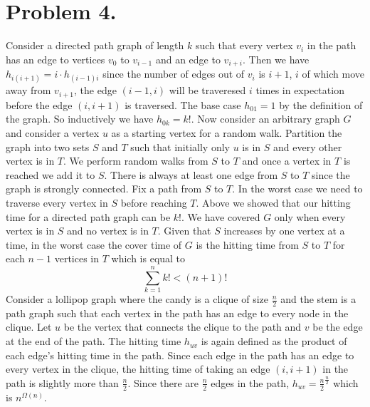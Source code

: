 \documentclass[12pt]{article}
\begin{document}
\pagestyle{plain}
\titleformat{\subsection}[runin]
  {\normalfont\large\bfseries}{\thesubsection}{1em}{}
\titleformat{\subsubsection}[runin]
  {\normalfont\large\bfseries}{\thesubsubsection}{1em}{}

\section*{Problem 4.}
Consider a directed path graph of length $k$ such that every vertex $v_i$ in the
path has an edge to vertices $v_0$ to $v_{i-1}$ and an edge to $v_{i+i}$. Then
we have $h_{i(i+1)} = i \cdot h_{(i-1)i}$ since the number of edges out of $v_i$
is $i+1$, $i$ of which move away from $v_{i+1}$, the edge $(i-1, i)$ will be
traveresed $i$ times in expectation before the edge $(i,i+1)$ is traversed. The
base case $h_{01} = 1$ by the definition of the graph. So inductively we have
$h_{0k} = k!$. Now consider an arbitrary graph $G$ and consider a vertex
$u$ as a starting vertex for a random walk. Partition the graph into two
sets $S$ and $T$ such that initially only $u$ is in $S$ and every other vertex
is in $T$. We perform random walks from $S$ to $T$ and once a vertex in $T$ is
reached we add it to $S$. There is always at least one edge from $S$ to $T$ since
the graph is strongly connected. Fix a path from $S$ to $T$. In the worst case
we need to traverse every vertex in $S$ before reaching $T$. Above we showed that
our hitting time for a directed path graph can be $k!$. We have covered $G$
only when every vertex is in $S$ and no vertex is in $T$. Given that $S$ increases
by one vertex at a time, in the worst case the cover time of $G$ is the hitting
time from $S$ to $T$ for each $n-1$ vertices in $T$ which is equal to
$$\sum_{k=1}^{n} k! < (n+1)!$$
Consider a lollipop graph where the candy is a clique of size $\frac{n}{2}$ and
the stem is a path graph such that each vertex in the path has an edge to every
node in the clique. Let $u$ be the vertex that connects the clique to the
path and $v$ be the edge at the end of the path. The hitting time $h_{uv}$ is
again defined as the product of each edge's hitting time in the path. Since
each edge in the path has an edge to every vertex in the clique, the hitting time
of taking an edge $(i,i+1)$ in the path is slightly more than $\frac{n}{2}$.
Since there are $\frac{n}{2}$ edges in the path,
$h_{uv} = \frac{n}{2}^{\frac{n}{2}}$ which is $n^{\Omega(n)}$.
\end{document}
